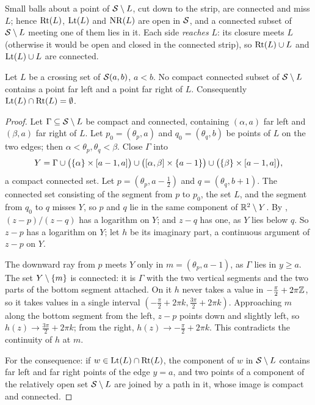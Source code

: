
Small balls about a point of $\mathcal{S}\setminus L$, cut down to the strip, are connected and miss $L$; hence $\operatorname{Rt}(L)$, $\operatorname{Lt}(L)$ and $\operatorname{NR}(L)$ are open in
$\mathcal{S}$, and a connected subset of $\mathcal{S}\setminus L$ meeting one of them lies in it. Each side \emph{reaches} $L$: its closure meets $L$ (otherwise it would
be open and closed in the connected strip), so $\operatorname{Rt}(L)\cup L$ and $\operatorname{Lt}(L)\cup L$ are connected.


\begin{theorem}\label{thm:strip-sep}
Let $L$ be a crossing set of $\mathcal{S}(a,b)$, $a<b$. No compact connected subset of $\mathcal{S}\setminus L$ contains a point far left and a point far right of
$L$. Consequently $\operatorname{Lt}(L)\cap\operatorname{Rt}(L)=\emptyset$.
\end{theorem}

\begin{proof}
Let $\Gamma\subseteq\mathcal{S}\setminus L$ be compact and connected, containing $(\alpha,a)$ far left and $(\beta,a)$ far right of $L$. Let $p_0=(\theta_p,a)$ and $q_0=(\theta_q,b)$
be points of $L$ on the two edges; then $\alpha<\theta_p,\theta_q<\beta$. Close $\Gamma$ into
\[
Y=\Gamma\cup\bigl(\left\{ \alpha \right\}\times[a-1,a]\bigr)\cup\bigl([\alpha,\beta]\times\left\{ a-1 \right\}\bigr)\cup\bigl(\left\{ \beta \right\}\times[a-1,a]\bigr),
\]
a compact connected set. Let $p=(\theta_p,a-\tfrac12)$ and $q=(\theta_q,b+1)$. The connected set consisting of the segment from $p$ to $p_0$, the set $L$, and the
segment from $q_0$ to $q$ misses $Y$, so $p$ and $q$ lie in the same component of $\mathbb{R}^2\setminus Y$. By , $(z-p)/(z-q)$ has a logarithm on
$Y$; and $z-q$ has one, as $Y$ lies below $q$. So $z-p$ has a logarithm on $Y$; let $h$ be its imaginary part, a continuous argument of $z-p$ on $Y$.

The downward ray from $p$ meets $Y$ only in $m=(\theta_p,a-1)$, as $\Gamma$ lies in $y\ge a$. The set $Y\setminus\left\{ m \right\}$ is connected: it is $\Gamma$ with the two
vertical segments and the two parts of the bottom segment attached. On it $h$ never takes a value in $-\frac\pi2+2\pi\mathbb{Z}$, so it takes values in a single interval
$(-\frac\pi2+2\pi k,\frac{3\pi}2+2\pi k)$. Approaching $m$ along the bottom segment from the left, $z-p$ points down and slightly left, so $h(z)\to\frac{3\pi}2+2\pi k$;
from the right, $h(z)\to-\frac\pi2+2\pi k$. This contradicts the continuity of $h$ at $m$.

For the consequence: if $w\in\operatorname{Lt}(L)\cap\operatorname{Rt}(L)$, the component of $w$ in $\mathcal{S}\setminus L$ contains far left and far right points of the edge $y=a$, and two points of
a component of the relatively open set $\mathcal{S}\setminus L$ are joined by a path in it, whose image is compact and connected.
\end{proof}


